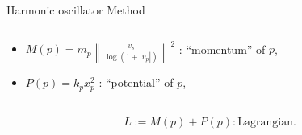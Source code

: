 \documentclass[aspectratio=169, bigfiles, professionalfonts, hyperref={colorlinks=true, allcolors=., urlcolor=blue}]{beamer}
\newcommand{\R}{\mathbb{R}}
\begin{document}
\begin{frame}{Harmonic oscillator Method}
\begin{columns}[t]
\begin{column}{0.7\textwidth}
\begin{itemize}
        \item
        $M(p) = m_{p}\left\|\frac{v_{s}}{\log(1+|v_{p}|)}\right\|^{2}$ : ``momentum'' of $p$,
        \item
        $P(p) = k_{p}x_{p}^{2}$ : ``potential'' of $p$,
    \end{itemize}
\end{column}
\end{columns}
\begin{tcolorbox}[colframe=yellow,
colback=yellow!10!white,
colbacktitle=yellow!40!white,
coltitle=black, fonttitle=\bfseries]
\vspace{-4mm}
    \begin{align*}
        L := M(p) + P(p) : \text{Lagrangian}.
    \end{align*}
\end{tcolorbox}
\end{frame}
\end{document}
